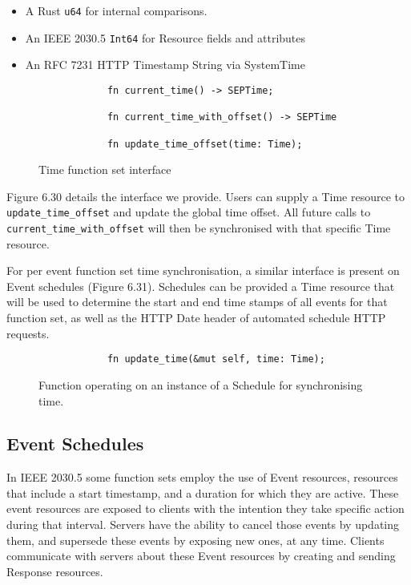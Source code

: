 \begin{itemize}
    \item A Rust \texttt{u64} for internal comparisons.
    \item An IEEE 2030.5 \texttt{Int64} for Resource fields and attributes
    \item An RFC 7231 HTTP Timestamp String via SystemTime
\end{itemize} 


\begin{figure}[h]
    \begin{center}
        \begin{lstlisting}
            fn current_time() -> SEPTime;
            
            fn current_time_with_offset() -> SEPTime
            
            fn update_time_offset(time: Time);
        \end{lstlisting}
        \label{fig:timeinterface}
        \vspace{-10pt}
        \caption{Time function set interface}
    \end{center}
\end{figure}

Figure 6.30 details the interface we provide. Users can supply a Time resource to \texttt{update\_time\_offset} and update the global time offset. All future calls to \texttt{current\_time\_with\_offset} will then be synchronised with that specific Time resource.

For per event function set time synchronisation, a similar interface is present on Event schedules (Figure 6.31). Schedules can be provided a Time resource that will be used to determine the start and end time stamps of all events for that function set, as well as the HTTP Date header of automated schedule HTTP requests.

\begin{figure}[h]
    \begin{center}
        \begin{lstlisting}
            fn update_time(&mut self, time: Time);
        \end{lstlisting}
        \label{fig:eventtime}
        \vspace{-10pt}
        \caption{Function operating on an instance of a Schedule for synchronising time.}
    \end{center}
\end{figure}

\subsection{Event Schedules}
In IEEE 2030.5 some function sets employ the use of Event resources, resources that include a start timestamp, and a duration for which they are active. These event resources are exposed to clients with the intention they take specific action during that interval. Servers have the ability to cancel those events by updating them, and supersede these events by exposing new ones, at any time. Clients communicate with servers about these Event resources by creating and sending Response resources. 

